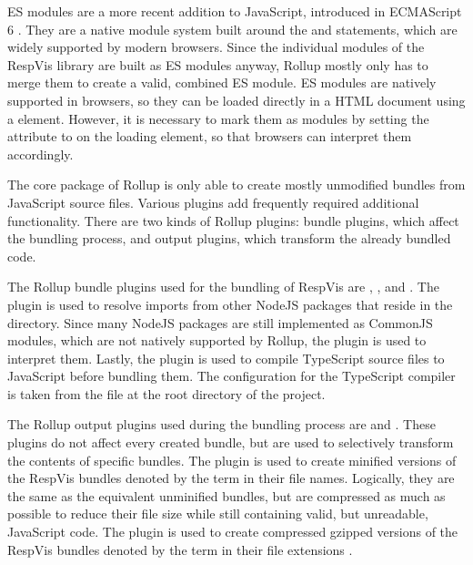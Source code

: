 ES modules are a more recent addition to JavaScript, introduced in
ECMAScript 6 \parencite{ECMAScript6}. They are a native module system
built around the  and  statements, which are
widely supported by modern browsers. Since the individual modules of
the RespVis library are built as ES modules anyway, Rollup mostly only
has to merge them to create a valid, combined ES module. ES modules
are natively supported in browsers, so they can be loaded directly in
a HTML document using a  element. However, it is
necessary to mark them as modules by setting the 
attribute to  on the loading  element,
so that browsers can interpret them accordingly.


The core package of Rollup is only able to create mostly unmodified
bundles from JavaScript source files. Various plugins add
frequently required additional functionality. There are two kinds of
Rollup plugins: bundle plugins, which affect the bundling process, and
output plugins, which transform the already bundled code.

The Rollup bundle plugins used for the bundling of RespVis are
, ,
and . The
 plugin is used to resolve imports
from other NodeJS packages that reside in the 
directory. Since many NodeJS packages are still implemented as
CommonJS modules, which are not natively supported by Rollup, the
 plugin is used to interpret them.
Lastly, the  plugin is used to compile
TypeScript source files to JavaScript before bundling them. The
configuration for the TypeScript compiler is taken from the
 file at the root directory of the project.

The Rollup output plugins used during the bundling process are
 and . These
plugins do not affect every created bundle, but are used to
selectively transform the contents of specific bundles. The
 plugin is used to create minified versions
of the RespVis bundles denoted by the term  in their file
names. Logically, they are the same as the equivalent unminified
bundles, but are compressed as much as possible to reduce their file
size while still containing valid, but unreadable, JavaScript
code. The  plugin is used to create
compressed gzipped versions of the RespVis bundles denoted by the term
 in their file extensions \parencite{GZIP}.

